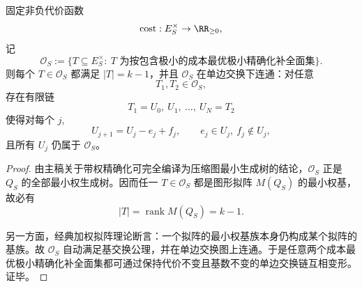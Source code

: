 \begin{proposition}[成本最优极小精确化簇的交换连通性]\label{prop:conclusion-screen-optimal-exactization-exchange-connected}
固定非负代价函数
\[
\mathrm{cost}:E_S^\times\to\RR_{\ge0},
\]
记
\[
\mathcal O_S
:=
\{T\subseteq E_S^\times:\ T \text{ 为按包含极小的成本最优极小精确化补全面集}\}.
\]
则每个 \(T\in\mathcal O_S\) 都满足 \(|T|=k-1\)，并且 \(\mathcal O_S\) 在单边交换下连通：对任意
\[
T_1,T_2\in\mathcal O_S,
\]
存在有限链
\[
T_1=U_0,\ U_1,\ \dots,\ U_N=T_2
\]
使得对每个 \(j\),
\[
U_{j+1}=U_j-e_j+f_j,
\qquad
e_j\in U_j,\ f_j\notin U_j,
\]
且所有 \(U_j\) 仍属于 \(\mathcal O_S\)。
\end{proposition}
\begin{proof}
由主稿关于带权精确化可完全编译为压缩图最小生成树的结论，\(\mathcal O_S\) 正是 \(Q_S\) 的全部最小权生成树。因而任一 \(T\in\mathcal O_S\) 都是图形拟阵 \(M(Q_S)\) 的最小权基，故必有
\[
|T|=\operatorname{rank}M(Q_S)=k-1.
\]

另一方面，经典加权拟阵理论断言：一个拟阵的最小权基族本身仍构成某个拟阵的基族。故 \(\mathcal O_S\) 自动满足基交换公理，并在单边交换图上连通。于是任意两个成本最优极小精确化补全面集都可通过保持代价不变且基数不变的单边交换链互相变形。证毕。
\end{proof}

